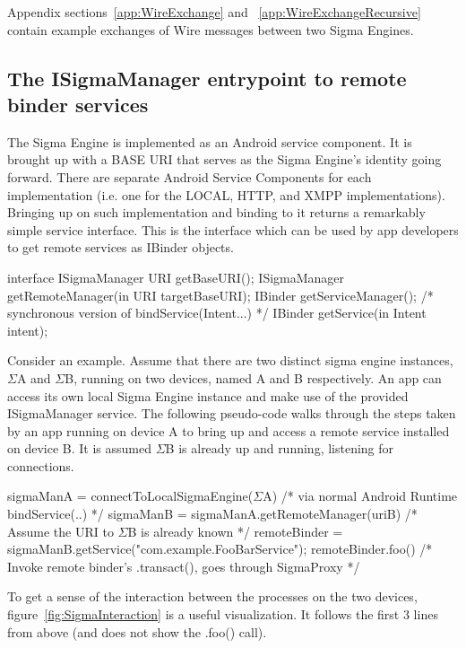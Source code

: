 \documentclass[prodmode]{acmlarge}
\begin{document}
Appendix sections~\ref{app:WireExchange} and ~\ref{app:WireExchangeRecursive} contain example exchanges of Wire messages between two Sigma Engines.

\subsection{The ISigmaManager entrypoint to remote binder services}
\label{sec:SigmaAsABinderService}
The Sigma Engine is implemented as an Android service component. It is brought up with a BASE URI that serves as the Sigma Engine's identity going forward. There are separate Android Service Components for each implementation (i.e. one for the LOCAL, HTTP, and XMPP implementations). Bringing up on such implementation and binding to it returns a remarkably simple service interface. This is the interface which can be used by app developers to get remote services as IBinder objects.

\begin{snippet}
interface ISigmaManager {
    URI getBaseURI();
    ISigmaManager getRemoteManager(in URI targetBaseURI);
    IBinder getServiceManager();
    /* synchronous version of bindService(Intent...) */
    IBinder getService(in Intent intent);
}
\end{snippet}

Consider an example. Assume that there are two distinct sigma engine instances, $\Sigma$A and $\Sigma$B, running on two devices, named A and B respectively. An app can access its own local Sigma Engine instance and make use of the provided ISigmaManager service. The following pseudo-code walks through the steps taken by an app running on device A to bring up and access a remote service installed on device B. It is assumed $\Sigma$B is already up and running, listening for connections.

\begin{snippet}
sigmaManA = connectToLocalSigmaEngine($\Sigma$A) /* via normal Android Runtime bindService(..) */
sigmaManB = sigmaManA.getRemoteManager(uriB) /*  Assume the URI to $\Sigma$B is already known */
remoteBinder = sigmaManB.getService("com.example.FooBarService");
remoteBinder.foo() /* Invoke remote binder's .transact(), goes through SigmaProxy */
\end{snippet}

To get a sense of the interaction between the processes on the two devices, figure~\ref{fig:SigmaInteraction} is a useful visualization. It follows the first 3 lines from above (and does not show the .foo() call).
\end{document}
